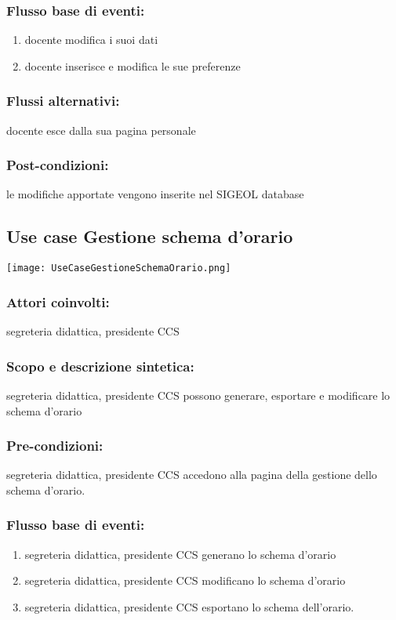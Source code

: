 \documentclass[11pt,a4paper]{article}
\begin{document}
\subsubsection*{Flusso base di eventi:}
\begin{enumerate}
 \item docente modifica i suoi dati 
 \item docente inserisce e modifica le sue preferenze
\end{enumerate}
\subsubsection*{Flussi alternativi:}
docente esce dalla sua pagina personale
\subsubsection*{Post-condizioni:}
le modifiche apportate vengono inserite nel SIGEOL database
\subsection{Use case Gestione schema d'orario}
\begin{center} 
 \texttt{[image: UseCaseGestioneSchemaOrario.png]}
\end{center}
\subsubsection*{Attori coinvolti:}
segreteria didattica, presidente CCS
\subsubsection*{Scopo e descrizione sintetica:}
segreteria didattica, presidente CCS possono generare, esportare e modificare lo schema d'orario
\subsubsection*{Pre-condizioni:}
segreteria didattica, presidente CCS accedono alla pagina della gestione dello schema d'orario.
\subsubsection*{Flusso base di eventi:}
\begin{enumerate} 
 \item segreteria didattica, presidente CCS generano lo schema d'orario
 \item segreteria didattica, presidente CCS modificano lo schema d'orario
 \item segreteria didattica, presidente CCS esportano lo schema dell'orario.
\end{enumerate}
\end{document}
